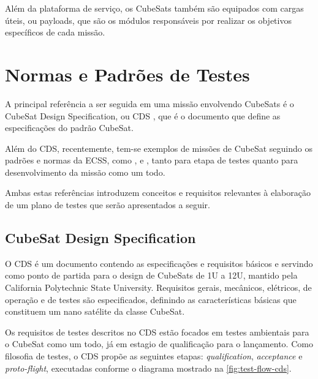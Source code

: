 Além da plataforma de serviço, os CubeSats também são equipados com cargas úteis, ou payloads, que são os módulos responsáveis por realizar os objetivos específicos de cada missão.

\section{Normas e Padrões de Testes}\label{sec:normas-ecss}

A principal referência a ser seguida em uma missão envolvendo CubeSats é o CubeSat Design Specification, ou \gls{CDS} \cite{cds}, que é o documento que define as especificações do padrão CubeSat.

Além do \gls{CDS}, recentemente, tem-se exemplos de missões de CubeSat seguindo os padrões e normas da \gls{ECSS}, como \textcite{floripasat-1}, \textcite{tailoring-ecss-nanosat} e \textcite{mist-eps}, tanto para etapa de testes quanto para desenvolvimento da missão como um todo.

Ambas estas referências introduzem conceitos e requisitos relevantes à elaboração de um plano de testes que serão apresentados a seguir.

\subsection{CubeSat Design Specification}

O \gls{CDS} é um documento contendo as especificações e requisitos básicos e servindo como ponto de partida para o design de CubeSats de 1U a 12U, mantido pela California Polytechnic State University.
Requisitos gerais, mecânicos, elétricos, de operação e de testes são especificados, definindo as características básicas que constituem um nano satélite da classe CubeSat.

Os requisitos de testes descritos no \gls{CDS} estão focados em testes ambientais para o CubeSat como um todo, já em estagio de qualificação para o lançamento.
Como filosofia de testes, o \gls{CDS} propõe as seguintes etapas: \textit{qualification}, \textit{acceptance} e \textit{proto-flight}, executadas conforme o diagrama mostrado na \autoref{fig:test-flow-cds}.

